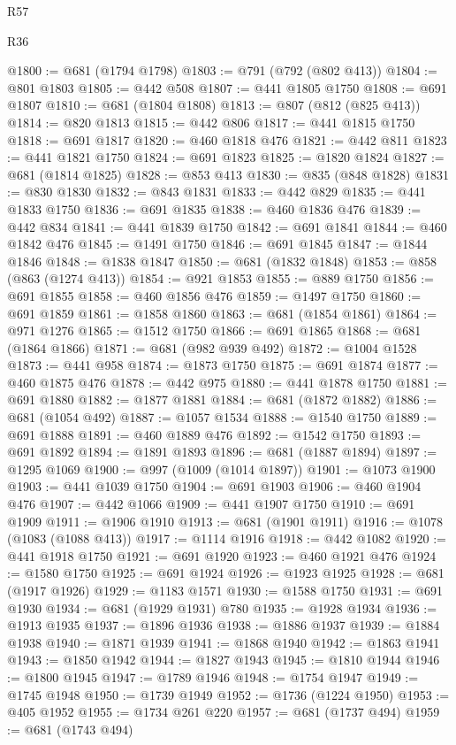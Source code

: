 \begin{lexlean}{R57}
\begin{lexlean}{R36}
\begin{coremodule}
{{{{{{{{{{{{{{{{{{{{{{{{{{{{{{{{{{{{{{{{{{{{{{{{{{{{{{{{{{{{{{{{{{{{{{{{{{{{{{{{{{@1800 := @681 (@1794 @1798)
@1803 := @791 (@792 (@802 @413))
@1804 := @801 @1803
@1805 := @442 @508
@1807 := @441 @1805 @1750
@1808 := @691 @1807
@1810 := @681 (@1804 @1808)
@1813 := @807 (@812 (@825 @413))
@1814 := @820 @1813
@1815 := @442 @806
@1817 := @441 @1815 @1750
@1818 := @691 @1817
@1820 := @460 @1818 @476
@1821 := @442 @811
@1823 := @441 @1821 @1750
@1824 := @691 @1823
@1825 := @1820 @1824
@1827 := @681 (@1814 @1825)
@1828 := @853 @413
@1830 := @835 (@848 @1828)
@1831 := @830 @1830
@1832 := @843 @1831
@1833 := @442 @829
@1835 := @441 @1833 @1750
@1836 := @691 @1835
@1838 := @460 @1836 @476
@1839 := @442 @834
@1841 := @441 @1839 @1750
@1842 := @691 @1841
@1844 := @460 @1842 @476
@1845 := @1491 @1750
@1846 := @691 @1845
@1847 := @1844 @1846
@1848 := @1838 @1847
@1850 := @681 (@1832 @1848)
@1853 := @858 (@863 (@1274 @413))
@1854 := @921 @1853
@1855 := @889 @1750
@1856 := @691 @1855
@1858 := @460 @1856 @476
@1859 := @1497 @1750
@1860 := @691 @1859
@1861 := @1858 @1860
@1863 := @681 (@1854 @1861)
@1864 := @971 @1276
@1865 := @1512 @1750
@1866 := @691 @1865
@1868 := @681 (@1864 @1866)
@1871 := @681 (@982 @939 @492)
@1872 := @1004 @1528
@1873 := @441 @958
@1874 := @1873 @1750
@1875 := @691 @1874
@1877 := @460 @1875 @476
@1878 := @442 @975
@1880 := @441 @1878 @1750
@1881 := @691 @1880
@1882 := @1877 @1881
@1884 := @681 (@1872 @1882)
@1886 := @681 (@1054 @492)
@1887 := @1057 @1534
@1888 := @1540 @1750
@1889 := @691 @1888
@1891 := @460 @1889 @476
@1892 := @1542 @1750
@1893 := @691 @1892
@1894 := @1891 @1893
@1896 := @681 (@1887 @1894)
@1897 := @1295 @1069
@1900 := @997 (@1009 (@1014 @1897))
@1901 := @1073 @1900
@1903 := @441 @1039 @1750
@1904 := @691 @1903
@1906 := @460 @1904 @476
@1907 := @442 @1066
@1909 := @441 @1907 @1750
@1910 := @691 @1909
@1911 := @1906 @1910
@1913 := @681 (@1901 @1911)
@1916 := @1078 (@1083 (@1088 @413))
@1917 := @1114 @1916
@1918 := @442 @1082
@1920 := @441 @1918 @1750
@1921 := @691 @1920
@1923 := @460 @1921 @476
@1924 := @1580 @1750
@1925 := @691 @1924
@1926 := @1923 @1925
@1928 := @681 (@1917 @1926)
@1929 := @1183 @1571
@1930 := @1588 @1750
@1931 := @691 @1930
@1934 := @681 (@1929 @1931) @780
@1935 := @1928 @1934
@1936 := @1913 @1935
@1937 := @1896 @1936
@1938 := @1886 @1937
@1939 := @1884 @1938
@1940 := @1871 @1939
@1941 := @1868 @1940
@1942 := @1863 @1941
@1943 := @1850 @1942
@1944 := @1827 @1943
@1945 := @1810 @1944
@1946 := @1800 @1945
@1947 := @1789 @1946
@1948 := @1754 @1947
@1949 := @1745 @1948
@1950 := @1739 @1949
@1952 := @1736 (@1224 @1950)
@1953 := @405 @1952
@1955 := @1734 @261 @220
@1957 := @681 (@1737 @494)
@1959 := @681 (@1743 @494)
}}}}}}}}}}}}}}}}}}}}}}}}}}}}}}}}}}}}}}}}}}}}}}}}}}}}}}}}}}}}}}}}}}}}}}}}}}}}}}}}}}
\end{coremodule}
\end{lexlean}
\end{lexlean}
